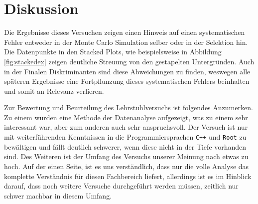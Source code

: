 \section{Diskussion}

Die Ergebnisse dieses Versuchen zeigen einen Hinweis auf einen systematischen Fehler 
entweder in der Monte Carlo Simulation selber oder in der Selektion hin. Die Datenpunkte 
in den Stacked Plots, wie beispielsweise in Abbildung \ref{fig:stackedex} zeigen deutliche 
Streuung von den gestapelten Untergründen. Auch in der Finalen Diskriminanten sind diese 
Abweichungen zu finden, weswegen alle späteren Ergebnisse eine Fortpflunzung dieses 
systematischen Fehlers beinhalten und somit an Relevanz verlieren. \par 

Zur Bewertung und Beurteilung des Lehrstuhlversuchs ist folgendes Anzumerken. Zu einem 
wurden eine Methode der Datenanalyse aufgezeigt, was zu einem sehr interessant war, aber 
zum anderen auch sehr anspruchsvoll. Der Versuch ist nur mit weiterführenden Kenntnissen 
in die Programmiersprachen \texttt{C++} und \texttt{Root} zu bewältigen und fällt deutlich 
schwerer, wenn diese nicht in der Tiefe vorhanden sind. Des Weiteren ist der Umfang des 
Versuchs unserer Meinung nach etwas zu hoch. Auf der einen Seite, ist es uns verständlich, 
dass nur die volle Analyse das komplette Verständnis für diesen Fachbereich liefert,
allerdings ist es im Hinblick darauf, dass noch weitere Versuche durchgeführt werden 
müssen, zeitlich nur schwer machbar in diesem Umfang.